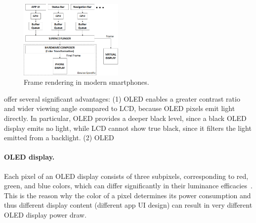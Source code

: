 


\begin{figure}[tp]
  \centering
        \includegraphics[width=0.45\textwidth]{./figure/1400_architecture.png}
        \vspace{-0.1in}
	\caption{Frame rendering in modern smartphones.}
        \vspace{-0.2in}
        \label{fig:arch}
\end{figure}

%
offer several
significant advantages: (1) OLED enables a greater contrast ratio and
wider viewing angle compared to LCD, because OLED pixels emit light
directly. In particular, OLED provides a deeper black level, since a
black OLED display emits no light, while
 LCD cannot show true black, since it filters the light emitted from a backlight.
 (2) OLED
 \fi


\paragraph{OLED display.}
Each pixel of an OLED display consists of three subpixels,
corresponding to red, green, and blue colors, which
can differ significantly in their luminance
efficacies~\cite{oled:2003,oled:2004}.  This is the reason why the color of a pixel determines
its power consumption and thus different display content (\eg different
app UI design) can result in very different OLED display power draw.

